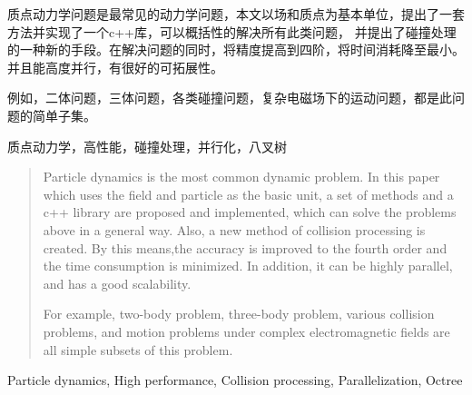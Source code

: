 \begin{zhaiyao}
质点动力学问题是最常见的动力学问题，本文以场和质点为基本单位，提出了一套方法并实现了一个c++库，可以概括性的解决所有此类问题，
并提出了碰撞处理的一种新的手段。在解决问题的同时，将精度提高到四阶，将时间消耗降至最小。并且能高度并行，有很好的可拓展性。


例如，二体问题，三体问题，各类碰撞问题，复杂电磁场下的运动问题，都是此问题的简单子集。
\end{zhaiyao}


\begin{guanjianci}
质点动力学，高性能，碰撞处理，并行化，八叉树
\end{guanjianci}



\begin{abstract}
    Particle dynamics is the most common dynamic problem. In this paper which uses the field and particle as the basic unit, a set of methods and a c++ library are proposed and implemented, which can solve the problems above in a general way. Also, a new method of collision processing is created. By this means,the accuracy is improved to the fourth order and the time consumption is minimized. In addition, it can be highly parallel, and has a good scalability.
    

    For example, two-body problem, three-body problem, various collision problems, and motion problems under complex electromagnetic fields are all simple subsets of this problem.    
\end{abstract}


\begin{keywords}
Particle dynamics, High performance, Collision processing, Parallelization, Octree
\end{keywords}
